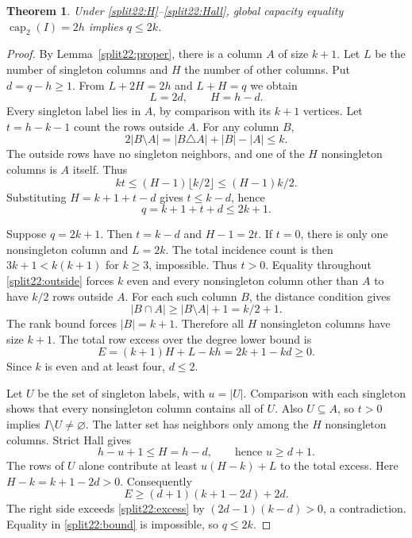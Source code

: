 \documentclass[11pt,a4paper]{article}
\newtheorem{theorem}{Theorem}[section]
\theoremstyle{definition}\newtheorem{definition}[theorem]{Definition}
\theoremstyle{remark}\newtheorem{remark}[theorem]{Remark}
\begin{document}
\begin{theorem}\label{split22:global}
Under \eqref{split22:H}--\eqref{split22:Hall}, global capacity equality $\operatorname{cap}_2(I)=2h$
implies $q\leq2k$.
\end{theorem}
\begin{proof}
By Lemma~\ref{split22:proper}, there is a column $A$ of size $k+1$.
Let $L$ be the number of singleton columns and $H$ the number of other
columns. Put $d=q-h\geq1$. From $L+2H=2h$ and $L+H=q$ we obtain
\begin{equation}\label{split22:LH}
 L=2d,\qquad H=h-d.
\end{equation}
Every singleton label lies in $A$, by comparison with its $k+1$ vertices.
Let $t=h-k-1$ count the rows outside $A$. For any column $B$,
\[
 2|B\setminus A|=|B\triangle A|+|B|-|A|\leq k.
\]
The outside rows have no singleton neighbors, and one of the $H$
nonsingleton columns is $A$ itself. Thus
\begin{equation}\label{split22:outside}
 kt\leq(H-1)\lfloor k/2\rfloor\leq(H-1)k/2.
\end{equation}
Substituting $H=k+1+t-d$ gives $t\leq k-d$, hence
\begin{equation}\label{split22:bound}
 q=k+1+t+d\leq2k+1.
\end{equation}

Suppose $q=2k+1$. Then $t=k-d$ and $H-1=2t$. If $t=0$, there is only
one nonsingleton column and $L=2k$. The total incidence count is then
$3k+1<k(k+1)$ for $k\geq3$, impossible. Thus $t>0$. Equality throughout
\eqref{split22:outside} forces $k$ even and every nonsingleton column other than
$A$ to have $k/2$ rows outside $A$. For each such column $B$, the distance
condition gives
\[
 |B\cap A|\geq |B\setminus A|+1=k/2+1.
\]
The rank bound forces $|B|=k+1$. Therefore all $H$ nonsingleton columns
have size $k+1$. The total row excess over the degree lower bound is
\begin{equation}\label{split22:excess}
 E=(k+1)H+L-kh=2k+1-kd\geq0.
\end{equation}
Since $k$ is even and at least four, $d\leq2$.

Let $U$ be the set of singleton labels, with $u=|U|$. Comparison with each
singleton shows that every nonsingleton column contains all of $U$.
Also $U\subseteq A$, so $t>0$ implies $I\setminus U\ne\varnothing$.
The latter set has neighbors only among the $H$ nonsingleton columns.
Strict Hall gives
\[
 h-u+1\leq H=h-d,\qquad\text{hence }u\geq d+1.
\]
The rows of $U$ alone contribute at least $u(H-k)+L$ to the total excess.
Here $H-k=k+1-2d>0$. Consequently
\[
 E\geq(d+1)(k+1-2d)+2d.
\]
The right side exceeds \eqref{split22:excess} by $(2d-1)(k-d)>0$, a contradiction.
Equality in \eqref{split22:bound} is impossible, so $q\leq2k$.
\end{proof}
\end{document}
